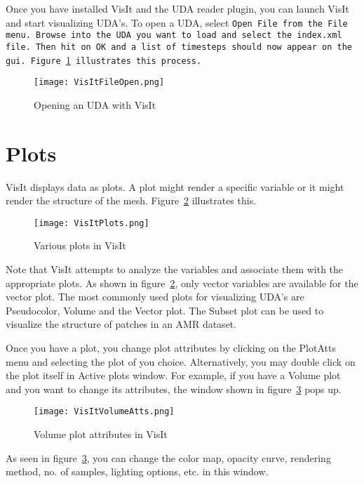 Once you have installed VisIt and the UDA reader plugin, you can launch VisIt and start visualizing UDA's. To open a UDA, select \tt Open File \normalfont from the \tt  File \normalfont menu. Browse into the UDA you want to load and select the \tt index.xml \normalfont file. Then hit on \tt OK \normalfont and a list of timesteps should now appear on the gui. Figure~\ref{VisItFileOpen} illustrates this process.

\begin{figure}
  \center
  \texttt{[image: VisItFileOpen.png]}
  \caption{Opening an UDA with VisIt}
  \label{VisItFileOpen}
\end{figure}

\section{Plots}

VisIt displays data as plots. A plot might render a specific variable or it might render the structure of the mesh. Figure~\ref{VisItPlots} illustrates this.

\begin{figure}
  \center
  \texttt{[image: VisItPlots.png]}
  \caption{Various plots in VisIt}
  \label{VisItPlots}
\end{figure}

Note that VisIt attempts to analyze the variables and associate them with the appropriate plots. As shown in figure~\ref{VisItPlots}, only vector variables are available for the vector plot. The most commonly used plots for visualizing UDA's are Pseudocolor, Volume and the Vector plot. The Subset plot can be used to visualize the structure of patches in an AMR dataset. %

Once you have a plot, you change plot attributes by clicking on the PlotAtts menu and selecting the plot of you choice. Alternatively, you may double click on the plot itself in Active plots window. For example, if you have a Volume plot and you want to change its attributes, the window shown in figure~\ref{VisItVolumeAtts} pops up.

\begin{figure}
  \center
  \texttt{[image: VisItVolumeAtts.png]}
  \caption{Volume plot attributes in VisIt}
  \label{VisItVolumeAtts}
\end{figure}

As seen in figure~\ref{VisItVolumeAtts}, you can change the color map, opacity curve, rendering method, no. of samples, lighting options, etc. in this window.

